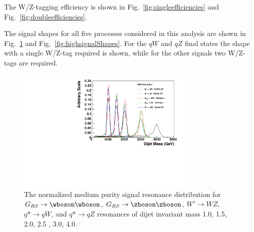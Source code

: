 The W/Z-tagging efficiency is shown in Fig.~\ref{fig:singleefficiencies} and Fig.~\ref{fig:doubleefficiencies}.


The signal shapes for all five processes considered in this analysis are shown in Fig.~\ref{fig:mediumsignalShapes} and Fig.~\ref{fig:highsignalShapes}.  
For the $qW$ and $qZ$ final states the shape with a single W/Z-tag required is shown, while for the other signals two W/Z-tags are required.



\begin{figure}[htb]
\begin{center}
\includegraphics[width=0.75\textwidth]{figs/signal-acc-eff/resonance-shape-medium.pdf}
\end{center}
\caption{The normalized medium purity signal resonance distribution for  $G_{RS}\to \wboson\wboson$, $G_{RS}\to \zboson\zboson$, $W' \to WZ$, $q*\to qW$, and $q*\to qZ$ resonances of dijet invariant mass 1.0\TeVcc, 1.5\TeVcc, 2.0\TeVcc, 2.5 \TeVcc,  3.0\TeVcc, 4.0\TeVcc.
}
\label{fig:mediumsignalShapes}
\end{figure}


